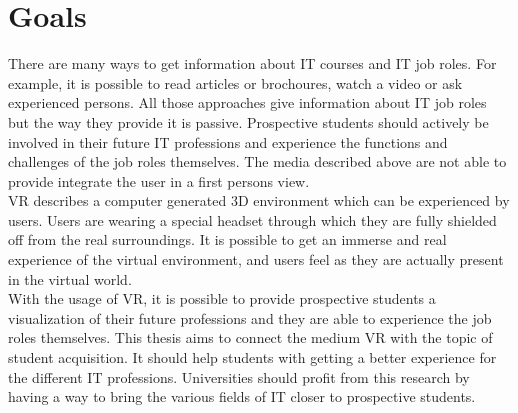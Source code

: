 \section{Goals}
There are many ways to get information about IT courses and IT job roles. For example, it is possible to read articles or brochoures, watch a video or ask experienced persons. All those approaches give information about IT job roles but the way they  provide it is passive. Prospective students should actively be involved in their future IT professions and experience the functions and challenges of the job roles themselves. The media described above are not able to provide integrate the user in a first persons view. \\
 VR describes a computer generated 3D environment which can be experienced by users. Users are wearing a special headset through which they are fully shielded off from the real surroundings. It is possible to get an immerse and real experience of the virtual environment, and users feel as they are actually present in the virtual world. \cite{Linowes.2015}\\
With the usage of VR, it is possible to provide prospective students a visualization of their future professions and they are able to experience the job roles themselves. This thesis aims to connect the medium VR with the topic of student acquisition. It should help students with getting a better experience for the different IT professions. Universities should profit from this research by having a way to bring the various fields of IT closer to prospective students.

